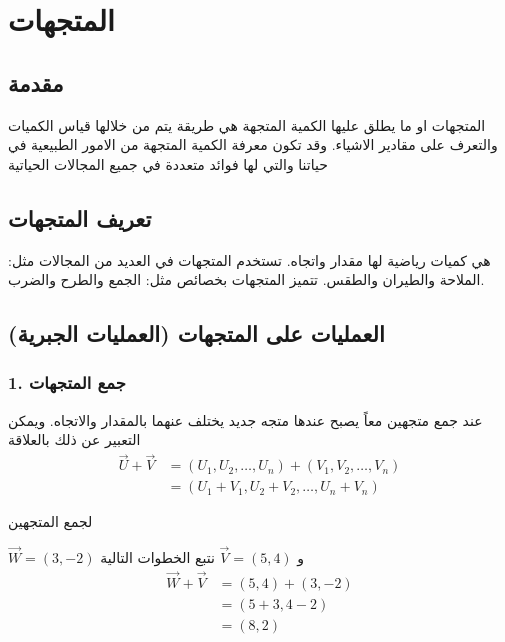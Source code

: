 \chapter{المتجهات}

	\begin{figure}[H]
	\centering
\end{figure}

\section{مقدمة}
المتجهات او ما يطلق عليها الكمية المتجهة هي طريقة يتم من خلالها قياس الكميات والتعرف على مقادير الاشياء. وقد تكون معرفة الكمية المتجهة من الامور الطبيعية في حياتنا والتي لها فوائد متعددة في جميع المجالات الحياتية

\section{تعريف المتجهات}
هي كميات رياضية لها مقدار واتجاه. تستخدم المتجهات في العديد من المجالات مثل: الملاحة والطيران والطقس. تتميز المتجهات بخصائص مثل: الجمع والطرح والضرب.

\section{العمليات على المتجهات (العمليات الجبرية)}
\subsection*{1. جمع المتجهات}
عند جمع متجهين معاً يصبح عندها متجه جديد يختلف عنهما بالمقدار والاتجاه. ويمكن التعبير عن ذلك بالعلاقة
\begin{align*}
	\vec{U} + \vec{V} &= (U_1, U_2, \dots, U_n) + (V_1, V_2, \dots, V_n)\\
	&= (U_1+V_1, U_2+V_2, \dots, U_n+V_n)
\end{align*}
\begin{example}
لجمع المتجهين
	
	$\vec{W} = (3,-2)$ و $\vec{V} = (5,4)$
	نتبع الخطوات التالية
	\begin{align*}
		\vec{W} + \vec{V} &= (5,4) + (3,-2)\\
		&= (5+3, 4-2)\\
		&= (8,2)
	\end{align*}
\end{example}


